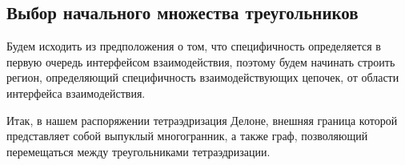 






\subsection{Выбор начального множества треугольников}

Будем исходить из предположения о том, что специфичность определяется в первую очередь интерфейсом взаимодействия, поэтому будем начинать строить регион, определяющий специфичность взаимодействующих цепочек, от области интерфейса взаимодействия.

Итак, в нашем распоряжении тетраэдризация Делоне, внешняя граница которой представляет собой выпуклый многогранник, а также граф, позволяющий перемещаться между треугольниками тетраэдризации.

